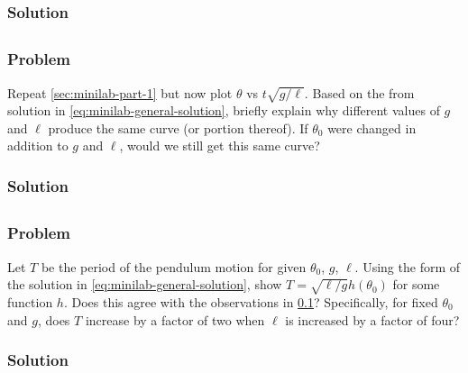 \documentclass[12pt]{article}
\begin{document}
  \subsubsection*{Solution}
  \todo

\subsection{}
  \label{sec:minilab-part-2}
  \subsubsection*{Problem}
  Repeat \cref{sec:minilab-part-1} but now plot $\theta$ vs $t\sqrt{g/\ell}$.
  Based on the from solution in \cref{eq:minilab-general-solution}, briefly
  explain why different values of $g$ and $\ell$ produce the same curve (or
  portion thereof). If $\theta_0$ were changed in addition to $g$ and $\ell$,
  would we still get this same curve?

  \subsubsection*{Solution}
    \todo

\subsection{}
  \subsubsection*{Problem}
  Let $T$ be the period of the pendulum motion for given $\theta_0$, $g$, $\ell$.
  Using the form of the solution in \cref{eq:minilab-general-solution}, show
  $T=\sqrt{\ell/g}h(\theta_0)$ for some function $h$. Does this agree with the
  observations in \cref{sec:minilab-part-2}? Specifically, for fixed $\theta_0$
  and $g$, does $T$ increase by a factor of two when $\ell$ is increased by a
  factor of four?

  \subsubsection*{Solution}
  \todo
\end{document}
